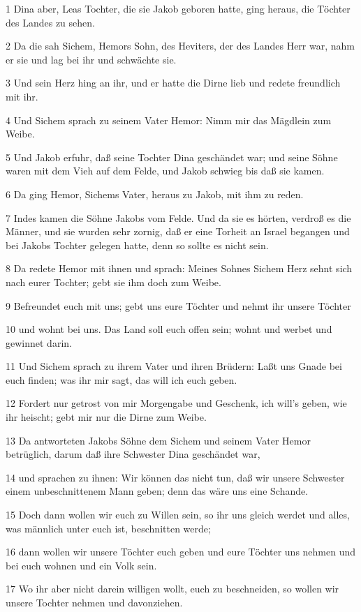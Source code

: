 \par 1 Dina aber, Leas Tochter, die sie Jakob geboren hatte, ging heraus, die Töchter des Landes zu sehen.
\par 2 Da die sah Sichem, Hemors Sohn, des Heviters, der des Landes Herr war, nahm er sie und lag bei ihr und schwächte sie.
\par 3 Und sein Herz hing an ihr, und er hatte die Dirne lieb und redete freundlich mit ihr.
\par 4 Und Sichem sprach zu seinem Vater Hemor: Nimm mir das Mägdlein zum Weibe.
\par 5 Und Jakob erfuhr, daß seine Tochter Dina geschändet war; und seine Söhne waren mit dem Vieh auf dem Felde, und Jakob schwieg bis daß sie kamen.
\par 6 Da ging Hemor, Sichems Vater, heraus zu Jakob, mit ihm zu reden.
\par 7 Indes kamen die Söhne Jakobs vom Felde. Und da sie es hörten, verdroß es die Männer, und sie wurden sehr zornig, daß er eine Torheit an Israel begangen und bei Jakobs Tochter gelegen hatte, denn so sollte es nicht sein.
\par 8 Da redete Hemor mit ihnen und sprach: Meines Sohnes Sichem Herz sehnt sich nach eurer Tochter; gebt sie ihm doch zum Weibe.
\par 9 Befreundet euch mit uns; gebt uns eure Töchter und nehmt ihr unsere Töchter
\par 10 und wohnt bei uns. Das Land soll euch offen sein; wohnt und werbet und gewinnet darin.
\par 11 Und Sichem sprach zu ihrem Vater und ihren Brüdern: Laßt uns Gnade bei euch finden; was ihr mir sagt, das will ich euch geben.
\par 12 Fordert nur getrost von mir Morgengabe und Geschenk, ich will's geben, wie ihr heischt; gebt mir nur die Dirne zum Weibe.
\par 13 Da antworteten Jakobs Söhne dem Sichem und seinem Vater Hemor betrüglich, darum daß ihre Schwester Dina geschändet war,
\par 14 und sprachen zu ihnen: Wir können das nicht tun, daß wir unsere Schwester einem unbeschnittenem Mann geben; denn das wäre uns eine Schande.
\par 15 Doch dann wollen wir euch zu Willen sein, so ihr uns gleich werdet und alles, was männlich unter euch ist, beschnitten werde;
\par 16 dann wollen wir unsere Töchter euch geben und eure Töchter uns nehmen und bei euch wohnen und ein Volk sein.
\par 17 Wo ihr aber nicht darein willigen wollt, euch zu beschneiden, so wollen wir unsere Tochter nehmen und davonziehen.
